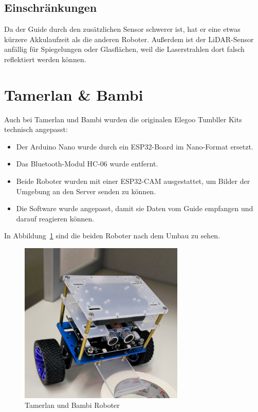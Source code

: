 \subsection{Einschränkungen}
Da der Guide durch den zusätzlichen Sensor schwerer ist, hat er eine etwas kürzere Akkulaufzeit als die anderen Roboter.
%
Außerdem ist der LiDAR-Sensor anfällig für Spiegelungen oder Glasflächen,
weil die Laserstrahlen dort falsch reflektiert werden können.

\section{Tamerlan \& Bambi}
\label{subsec:hardware_tamerlan_bambi}

Auch bei Tamerlan und Bambi wurden die originalen Elegoo Tumbller Kits technisch angepasst:
\begin{itemize}
    \item Der Arduino Nano wurde durch ein ESP32-Board im Nano-Format ersetzt.
    \item Das Bluetooth-Modul HC-06 wurde entfernt.
    \item Beide Roboter wurden mit einer ESP32-CAM ausgestattet, um Bilder der Umgebung an den Server senden zu können.
    \item Die Software wurde angepasst, damit sie Daten vom Guide empfangen und darauf reagieren können.
\end{itemize}
In Abbildung~\ref{fig:tamerlan_bambi} sind die beiden Roboter nach dem Umbau zu sehen.
\begin{figure}[H]
    \centering
    \includegraphics[width=0.7\textwidth]{img/Hardware/tumbler.jpg}
   \caption{Tamerlan und Bambi Roboter}
    \label{fig:tamerlan_bambi}
\end{figure}